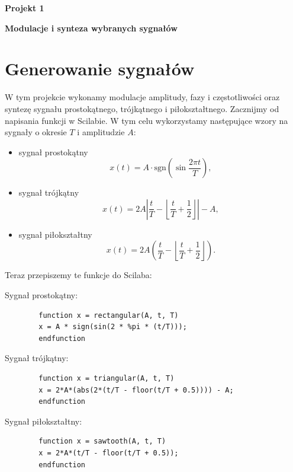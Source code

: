 \documentclass[12pt]{article}
\begin{document}
	\begin{center}
		\begin{LARGE}
			\textbf{Projekt 1}
		\end{LARGE}
	\end{center}
	\begin{center}
		\begin{Large}
			\textbf{Modulacje i synteza wybranych sygnałów}
		\end{Large}
	\end{center}
	\newpage
	\section{Generowanie sygnałów}
	W tym projekcie wykonamy modulacje amplitudy, fazy i częstotliwości oraz syntezę sygnału prostokątnego, trójkątnego i piłokształtnego. Zacznijmy od napisania funkcji w Scilabie. W tym celu wykorzystamy następujące wzory na sygnały o okresie $T$ i amplitudzie $A$:
	\begin{itemize}
		\item sygnał prostokątny
		\[
			x(t) = A\cdot \text{sgn}\left(\sin\frac{2\pi t}{T}\right),
		\]
		\item sygnał trójkątny
		\[
			x(t) = 2A\left|\frac{t}{T} - \left\lfloor \frac{t}{T} + \frac{1}{2} \right\rfloor \right| - A,
		\]
		\item sygnał piłokształtny
		\[
			x(t) = 2A\left(\frac{t}{T} - \left\lfloor \frac{t}{T} + \frac{1}{2} \right\rfloor \right).
		\]
	\end{itemize}
	Teraz przepiszemy te funkcje do Scilaba:
	
	Sygnał prostokątny:
	\begin{verbatim}
		function x = rectangular(A, t, T)
		x = A * sign(sin(2 * %pi * (t/T)));
		endfunction
	\end{verbatim}
	Sygnał trójkątny:
	\begin{verbatim}
		function x = triangular(A, t, T)
		x = 2*A*(abs(2*(t/T - floor(t/T + 0.5)))) - A;
		endfunction
	\end{verbatim}
	Sygnał piłokształtny:
	\begin{verbatim}
		function x = sawtooth(A, t, T)
		x = 2*A*(t/T - floor(t/T + 0.5));
		endfunction
	\end{verbatim}
\end{document}
